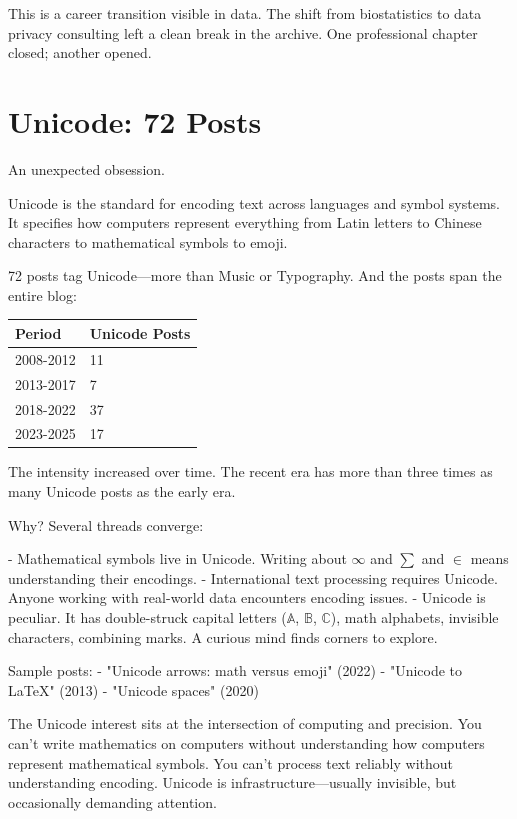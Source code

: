 This is a career transition visible in data. The shift from biostatistics to data privacy consulting left a clean break in the archive. One professional chapter closed; another opened.

\bigskip

\section*{Unicode: 72 Posts}

An unexpected obsession.

Unicode is the standard for encoding text across languages and symbol systems. It specifies how computers represent everything from Latin letters to Chinese characters to mathematical symbols to emoji.

72 posts tag Unicode—more than Music or Typography. And the posts span the entire blog:

\begin{center}
\begin{tabular}{ll}
\toprule
\textbf{Period} & \textbf{Unicode Posts} \\
\midrule
2008-2012 & 11 \\
2013-2017 & 7 \\
2018-2022 & 37 \\
2023-2025 & 17 \\
\bottomrule
\end{tabular}
\end{center}

The intensity increased over time. The recent era has more than three times as many Unicode posts as the early era.

Why? Several threads converge:

- Mathematical symbols live in Unicode. Writing about $\infty$ and $\sum$ and $\in$ means understanding their encodings.
- International text processing requires Unicode. Anyone working with real-world data encounters encoding issues.
- Unicode is peculiar. It has double-struck capital letters ($\mathbb{A}$, $\mathbb{B}$, $\mathbb{C}$), math alphabets, invisible characters, combining marks. A curious mind finds corners to explore.

Sample posts:
- "Unicode arrows: math versus emoji" (2022)
- "Unicode to LaTeX" (2013)
- "Unicode spaces" (2020)

The Unicode interest sits at the intersection of computing and precision. You can't write mathematics on computers without understanding how computers represent mathematical symbols. You can't process text reliably without understanding encoding. Unicode is infrastructure—usually invisible, but occasionally demanding attention.


